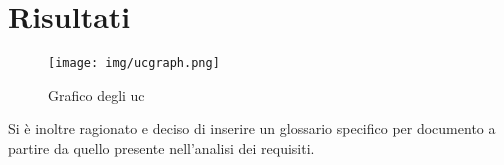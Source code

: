 \section{Risultati}

\begin{figure}[h]
    \caption{Grafico degli uc}
    \centering
    \texttt{[image: img/ucgraph.png]}
\end{figure}

Si è inoltre ragionato e deciso di inserire un glossario specifico per documento a partire da quello presente nell'analisi dei requisiti.